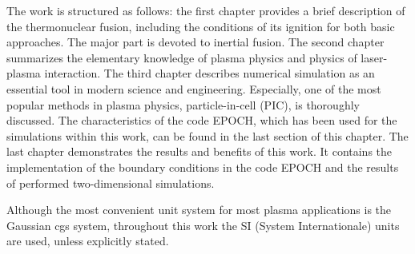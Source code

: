 The work is structured as follows: the first chapter provides a brief description of the thermonuclear fusion, including the conditions of its ignition for both basic approaches. The major part is devoted to inertial fusion. The second chapter summarizes the elementary knowledge of plasma physics and physics of laser-plasma interaction. The third chapter describes numerical simulation as an essential tool in modern science and engineering. Especially, one of the most popular methods in plasma physics, particle-in-cell (PIC), is thoroughly discussed. The characteristics of the code EPOCH\cite{bennett}, which has been used for the simulations within this work, can be found in the last section of this chapter. The last chapter demonstrates the results and benefits of this work. It contains the implementation of the boundary conditions in the code EPOCH and the results of performed two-dimensional simulations.

Although the most convenient unit system for most plasma applications is the Gaussian cgs system, throughout this work the SI (System Internationale) units are used, unless explicitly stated.
